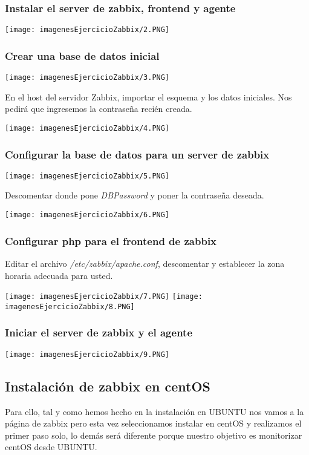 \documentclass[a4paper, 12pt]{article}
\begin{document}
\subsubsection{Instalar el server de zabbix, frontend y agente}
\texttt{[image: imagenesEjercicioZabbix/2.PNG]}
\subsubsection{Crear una base de datos inicial}
\texttt{[image: imagenesEjercicioZabbix/3.PNG]}
{\par En el host del servidor Zabbix, importar el esquema y los datos iniciales. Nos pedirá que ingresemos la contraseña recién creada.}
\texttt{[image: imagenesEjercicioZabbix/4.PNG]}
\subsubsection{Configurar la base de datos para un server de zabbix}
\texttt{[image: imagenesEjercicioZabbix/5.PNG]}
{\par Descomentar donde pone \textit{DBPassword} y poner la contraseña deseada. \par}
\texttt{[image: imagenesEjercicioZabbix/6.PNG]}
\subsubsection{Configurar php para el frontend de zabbix}
{\par Editar el archivo \textit{/etc/zabbix/apache.conf}, descomentar y establecer la zona horaria adecuada para usted. \par}
\texttt{[image: imagenesEjercicioZabbix/7.PNG]}
\texttt{[image: imagenesEjercicioZabbix/8.PNG]}
\subsubsection{Iniciar el server de zabbix y el agente}
\texttt{[image: imagenesEjercicioZabbix/9.PNG]}

\newpage

\subsection{Instalación de zabbix en centOS}
{Para ello, tal y como hemos hecho en la instalación en UBUNTU nos vamos a la página de zabbix pero esta vez seleccionamos instalar en centOS y realizamos el primer paso solo, lo demás será diferente porque nuestro objetivo es monitorizar centOS desde UBUNTU. \par}
\end{document}
